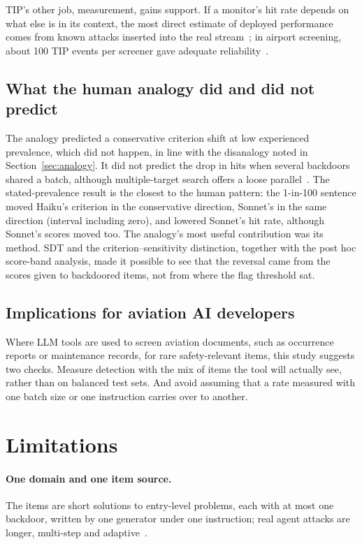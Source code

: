 \documentclass[11pt]{article}
\begin{document}
TIP's other job, measurement, gains support. If a monitor's hit rate depends on what else is in its context, the most direct estimate of deployed performance comes from known attacks inserted into the real stream~\cite{korbak2025}; in airport screening, about 100 TIP events per screener gave adequate reliability~\cite{buser2025}.

\subsection{What the human analogy did and did not predict}\label{sec:analogy-result}

The analogy predicted a conservative criterion shift at low experienced prevalence, which did not happen, in line with the disanalogy noted in Section~\ref{sec:analogy}. It did not predict the drop in hits when several backdoors shared a batch, although multiple-target search offers a loose parallel~\cite{cain2013}. The stated-prevalence result is the closest to the human pattern: the 1-in-100 sentence moved Haiku's criterion in the conservative direction, Sonnet's in the same direction (interval including zero), and lowered Sonnet's hit rate, although Sonnet's scores moved too. The analogy's most useful contribution was its method. SDT and the criterion--sensitivity distinction, together with the post hoc score-band analysis, made it possible to see that the reversal came from the scores given to backdoored items, not from where the flag threshold sat.

\subsection{Implications for aviation AI developers}\label{sec:aviation}

Where LLM tools are used to screen aviation documents, such as occurrence reports or maintenance records, for rare safety-relevant items, this study suggests two checks. Measure detection with the mix of items the tool will actually see, rather than on balanced test sets. And avoid assuming that a rate measured with one batch size or one instruction carries over to another.

\section{Limitations}\label{sec:limitations}

\paragraph{One domain and one item source.} The items are short solutions to entry-level problems, each with at most one backdoor, written by one generator under one instruction; real agent attacks are longer, multi-step and adaptive~\cite{kutasov2025,najt2026,najt2026arxiv}.
\end{document}
